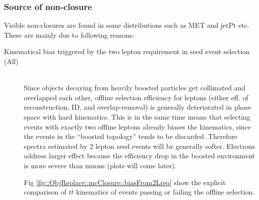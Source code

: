 \clearpage
\subsubsection{Source of non-closure} \label{sec::ObjReplace::NonClosure} 
Visible non-closures are found in some distributions such as MET and jetPt etc. These are mainly due to following reasons:

\begin{description}
\item [Kinematical bias triggered by the two lepton requirement in seed event selection (All)] \mbox{} \\
Since objects decaying from heavily boosted particles get collimated and overlapped each other, offline selection efficiency for leptons (either eff. of reconstruction, ID, and overlap-removal) is generally deteriorated in phase space with hard kinematics. This is in the same time means that selecting events with exactly two offline leptons already biases the kinematics, since the events in the ``boosted topology'' tends to be discarded. Therefore spectra estimated by 2 lepton seed events will be generally softer. Electrons address larger effect because the efficiency drop in the boosted environment is more severe than muons (plots will come later).

Fig \ref{fig::ObjReplace::mcClosure::biasFrom2Lreq} show the explicit comparison of $t\bar{t}$ kinematics of events passing or failing the offline selection.


\end{description}
